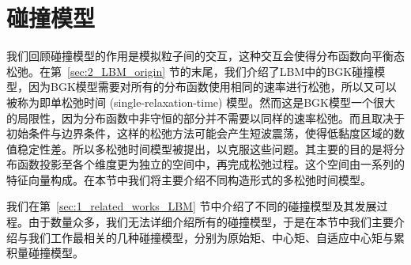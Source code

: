 \section{碰撞模型}
\label{sec:bg_collision}
我们回顾碰撞模型的作用是模拟粒子间的交互，这种交互会使得分布函数向平衡态松弛。在第~\ref{sec:2_LBM_origin} 节的末尾，我们介绍了LBM中的BGK碰撞模型，因为BGK模型需要对所有的分布函数使用相同的速率进行松弛，所以又可以被称为即单松弛时间 (single-relaxation-time) 模型。然而这是BGK模型一个很大的局限性，因为分布函数中非守恒的部分并不需要以同样的速率松弛。而且取决于初始条件与边界条件，这样的松弛方法可能会产生短波震荡，使得低黏度区域的数值稳定性差。所以多松弛时间模型被提出，以克服这些问题。其主要的目的是将分布函数投影至各个维度更为独立的空间中，再完成松弛过程。这个空间由一系列的特征向量构成。在本节中我们将主要介绍不同构造形式的多松弛时间模型。

我们在第~\ref{sec:1_related_works_LBM} 节中介绍了不同的碰撞模型及其发展过程。由于数量众多，我们无法详细介绍所有的碰撞模型，于是在本节中我们主要介绍与我们工作最相关的几种碰撞模型，分别为原始矩、中心矩、自适应中心矩与累积量碰撞模型。

